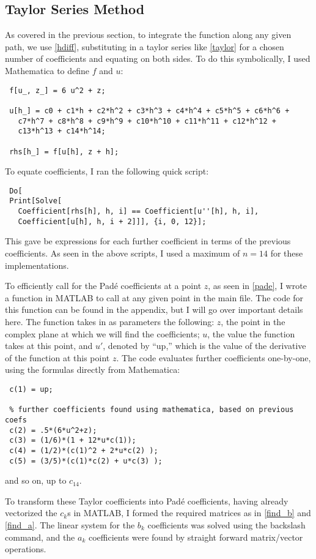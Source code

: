 \documentclass[12pt]{article}
\begin{document}
\subsection{ Taylor Series Method }
As covered in the previous section, to integrate the function along any given path, we use \eqref{hdiff}, substituting in a taylor series like \eqref{taylor} for a chosen number of coefficients and equating on both sides. To do this symbolically, I used Mathematica to define $f$ and $u$: 
\begin{verbatim}
 f[u_, z_] = 6 u^2 + z;
 
 u[h_] = c0 + c1*h + c2*h^2 + c3*h^3 + c4*h^4 + c5*h^5 + c6*h^6 + 
   c7*h^7 + c8*h^8 + c9*h^9 + c10*h^10 + c11*h^11 + c12*h^12 + 
   c13*h^13 + c14*h^14;
   
 rhs[h_] = f[u[h], z + h];
\end{verbatim}
To equate coefficients, I ran the following quick script:
\begin{verbatim}
 Do[
 Print[Solve[
   Coefficient[rhs[h], h, i] == Coefficient[u''[h], h, i], 
   Coefficient[u[h], h, i + 2]]], {i, 0, 12}];
\end{verbatim}
This gave be expressions for each further coefficient in terms of the previous coefficients. As seen in the above scripts, I used a maximum of $n = 14$ for these implementations. 

To efficiently call for the Pad\'{e} coefficients at a point $z$, as seen in \eqref{pade}, I wrote a function in MATLAB to call at any given point in the main file. The code for this function can be found in the appendix, but I will go over important details here. The function takes in as parameters the following: $z$, the point in the complex plane at which we will find the coefficients; $u$, the value the function takes at this point, and $u'$, denoted by ``up,'' which is the value of the derivative of the function at this point $z$. The code evaluates further coefficients one-by-one, using the formulas directly from Mathematica: 
\begin{verbatim}
 c(1) = up;
    
 % further coefficients found using mathematica, based on previous coefs
 c(2) = .5*(6*u^2+z);
 c(3) = (1/6)*(1 + 12*u*c(1));
 c(4) = (1/2)*(c(1)^2 + 2*u*c(2) );
 c(5) = (3/5)*(c(1)*c(2) + u*c(3) );
\end{verbatim}
and so on, up to $c_{14}.$ 

To transform these Taylor coefficients into Pad\'{e} coefficients, having already vectorized the $c_k$s in MATLAB, I formed the required matrices as in \eqref{find_b} and \eqref{find_a}. The linear system for the $b_k$ coefficients was solved using the backslash command, and the $a_k$ coefficients were found by straight forward matrix/vector operations. 
\end{document}
